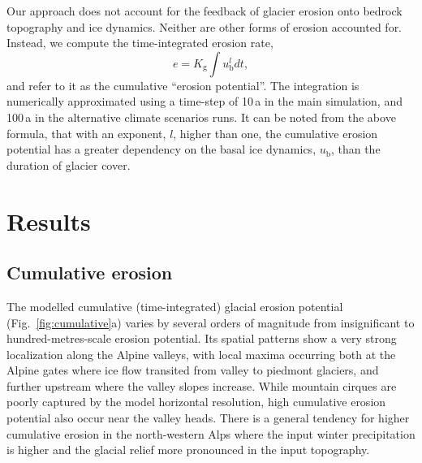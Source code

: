 \documentclass[utf8]{article}
\begin{document}
    Our approach does not account for the feedback of glacier erosion onto
    bedrock topography and ice dynamics. Neither are other forms of erosion
    accounted for. Instead, we compute the time-integrated erosion rate,
    \begin{equation}
        e =  K_\mathrm{g} \int u_\mathrm{b}^l dt,
    \end{equation}
    and refer to it as the cumulative ``erosion potential''. The integration
    is numerically approximated using a time-step of 10\,a in the
    main simulation, and 100\,a in the alternative climate scenarios runs. It
    can be noted from the above formula, that with an exponent, $l$,
    higher than one, the cumulative erosion potential has a greater dependency
    on the basal ice dynamics, $u_\mathrm{b}$, than the duration of glacier
    cover.


\section{Results}

\subsection{Cumulative erosion}

    The modelled cumulative (time-integrated) glacial erosion potential
    (Fig.~\ref{fig:cumulative}a) varies by several orders of magnitude
    from insignificant to hundred-metres-scale erosion potential. Its spatial
    patterns show a very strong localization along the Alpine valleys, with
    local maxima occurring both at
    the Alpine gates where ice flow transited from valley to piedmont glaciers,
    and further upstream where the valley slopes increase. While mountain
    cirques are poorly captured by the model horizontal resolution, high
    cumulative erosion potential also occur near the valley heads.
    There is a general tendency for higher cumulative erosion in the
    north-western Alps where the input winter precipitation
    \citep[WorldClim,][Fig.~1h]{Seguinot.etal.2018} is higher and the
    glacial relief more pronounced in the input topography.

\end{document}
